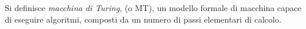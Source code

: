 \documentclass{subfiles}
\begin{document}
\label{sec:8}
\begin{Definition*}
    Si definisce \emph{macchina di Turing}, (o MT), un modello formale di macchina capace di eseguire algoritmi,
    composti da un numero di passi elementari di calcolo.
\end{Definition*}
\end{document}

